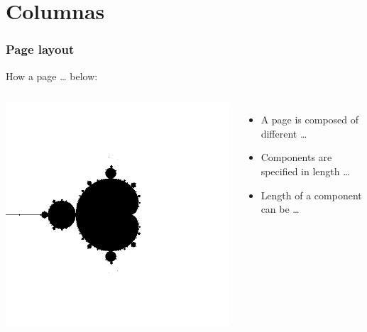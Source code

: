 \documentclass[12pt, aspectratio = 169]{beamer}
\begin{document}
    \section{Columnas}
        \begin{frame}
            \frametitle{Page layout}
            How a page … below:\pause\vskip 5mm
            \begin{columns}
                \includegraphics[width=\textwidth]{image4.png}
                \begin{itemize}[<+-|alert@+>]
                    \item A page is composed of different …
                    \item Components are specified in length …
                    \item Length of a component can be …
                \end{itemize}
            \end{columns}
        \end{frame}
\end{document}
